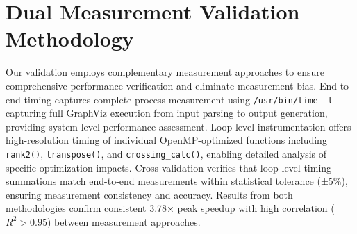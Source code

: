 \section{Dual Measurement Validation Methodology}
\label{appendix:dual_measurement}

Our validation employs complementary measurement approaches to ensure comprehensive performance verification and eliminate measurement bias. End-to-end timing captures complete process measurement using \texttt{/usr/bin/time -l} capturing full GraphViz execution from input parsing to output generation, providing system-level performance assessment. Loop-level instrumentation offers high-resolution timing of individual OpenMP-optimized functions including \texttt{rank2()}, \texttt{transpose()}, and \texttt{crossing\_calc()}, enabling detailed analysis of specific optimization impacts. Cross-validation verifies that loop-level timing summations match end-to-end measurements within statistical tolerance (±5\%), ensuring measurement consistency and accuracy. Results from both methodologies confirm consistent 3.78× peak speedup with high correlation ($R^2 > 0.95$) between measurement approaches.
